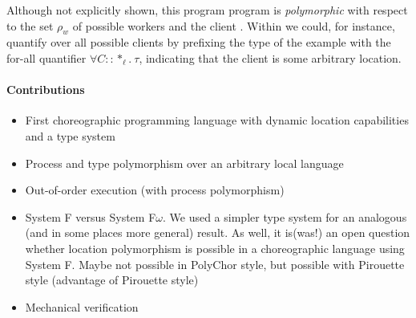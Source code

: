 Although not explicitly shown, this program program is \emph{polymorphic} with respect to the set $\rho_w$ of possible workers and the client \Client.
Within \langname we could, for instance, quantify over all possible clients by prefixing the type of the example with the for-all quantifier $\forall C :: *_\ell.~\tau$, indicating that the client is some arbitrary location.

\paragraph{Contributions}
\begin{itemize}
	\item First choreographic programming language with dynamic location capabilities and a type system
	\item Process and type polymorphism over an arbitrary local language
	\item Out-of-order execution (with process polymorphism)
	\item System F versus System F$\omega$. We used a simpler type system for an analogous (and in some places more general) result. As well, it is(was!) an open question whether location polymorphism is possible in a choreographic language using System F. Maybe not possible in PolyChor style, but possible with Pirouette style (advantage of Pirouette style)
	\item Mechanical verification
\end{itemize}

